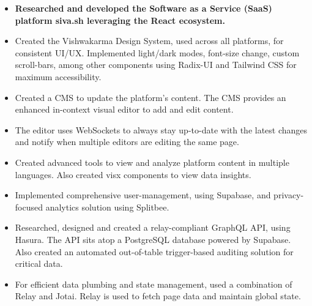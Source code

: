 \documentclass[10pt,a4paper,ragged2e,withhyper]{altacv}
\begin{document}
\tagline{}

\makecvheader



\begin{paracol}{2}


\begin{itemize}
\item \textbf{Researched and developed the Software as a Service (SaaS) platform \textbf{siva.sh} leveraging the React ecosystem.}
\item Created the Vishwakarma Design System, used across all platforms, for consistent UI/UX.
      Implemented light/dark modes, font-size change, custom scroll-bars, among other components using Radix-UI and Tailwind CSS for maximum accessibility.
\item Created a CMS to update the platform's content. The CMS provides an enhanced in-context visual editor to add and edit content.
\item The editor uses WebSockets to always stay up-to-date with the latest changes and notify when multiple editors are editing the same page.
\item Created advanced tools to view and analyze platform content in multiple languages.
      Also created visx components to view data insights.
\item Implemented comprehensive user-management, using Supabase, and privacy-focused analytics solution using Splitbee.
\item Researched, designed and created a relay-compliant GraphQL API, using Hasura.
      The API sits atop a PostgreSQL database powered by Supabase.
      Also created an automated out-of-table trigger-based auditing solution for critical data.
\item For efficient data plumbing and state management, used a combination of Relay and Jotai.
      Relay is used to fetch page data and maintain global state.

\end{itemize}
\end{paracol}
\end{document}
